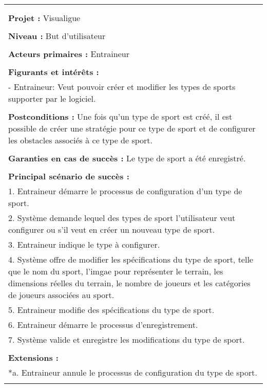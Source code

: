 \begin{longtable}{|p{16cm}|}
\newpage
\begin{flushleft}
	\textbf{Cas d'utilisation 7 : Configurer les types de sports}\\
\end{flushleft}
\begin{tabular}{|p{16cm}|}
	\hline
	\\
	\textbf{Projet :} Visualigue\\
	\\
	\textbf{Niveau :} But d'utilisateur\\
	\\
	\textbf{Acteurs primaires :} Entraineur\\
	\\
	\textbf{Figurants et intérêts :} \\
	- Entraineur: Veut pouvoir créer et modifier les types de sports supporter par le logiciel.\\
	\\
	\textbf{Postconditions :} Une fois qu'un type de sport est créé, il est possible de créer une stratégie pour ce type de sport et de configurer les obstacles associés à ce type de sport.\\
	\\
	\textbf{Garanties en cas de succès :} Le type de sport a été enregistré.\\
	\\
	\textbf{Principal scénario de succès :}\\
	1. Entraineur démarre le processus de configuration d'un  type de sport.\\
	2. Système demande lequel des types de sport l'utilisateur veut configurer ou s'il veut en créer un nouveau type de sport.\\
	3. Entraineur indique le type à configurer.\\
	4. Système offre de modifier les spécifications du type de sport, telle que le nom du sport, l'imgae pour représenter le terrain, les dimensions réelles du terrain, le nombre de joueurs et les catégories de joueurs associées au sport.\\
	5. Entraineur modifie des spécifications du type de sport.\\
	6. Entraineur démarre le processus d'enregistrement.\\
	7. Système valide et enregistre les modifications du type de sport.\\
	\\
	\textbf{Extensions :}\\
	*a. Entraineur annule le processus de configuration du type de sport.\\

\end{tabular}
\end{longtable}
